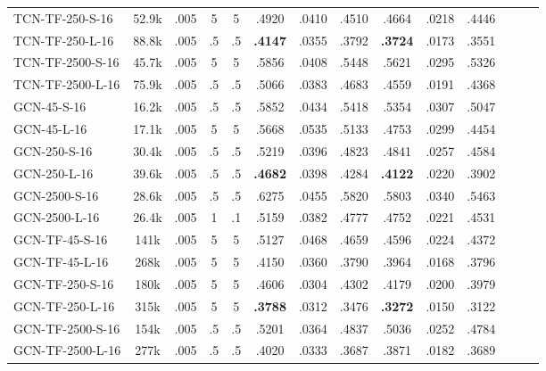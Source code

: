 \begin{table*}[h]
\begin{tabular}{lccccccccccccc}
        TCN-TF-250-S-16               
            & 52.9k & .005 & 5 & 5 & .4920 & .0410 & .4510 & .4664 & .0218 & .4446 \\
        TCN-TF-250-L-16               
            & 88.8k & .005 & .5 & .5 & \textbf{.4147} & .0355 & .3792 & \textbf{.3724} & .0173 & .3551 \\
        TCN-TF-2500-S-16               
            & 45.7k & .005 & 5 & 5 & .5856 & .0408 & .5448 & .5621 & .0295 & .5326 \\
        TCN-TF-2500-L-16               
            & 75.9k & .005 & .5 & .5 & .5066 & .0383 & .4683 & .4559 & .0191 & .4368 \\
        \midrule
        GCN-45-S-16               
            & 16.2k & .005 & .5 & .5 & .5852 & .0434 & .5418 & .5354 & .0307 & .5047 \\ 
        GCN-45-L-16               
            & 17.1k & .005 & 5 & 5 & .5668 & .0535 & .5133 & .4753 & .0299 & .4454 \\
        GCN-250-S-16               
            & 30.4k & .005 & .5 & .5 & .5219 & .0396 & .4823 & .4841 & .0257 & .4584 \\ 
        GCN-250-L-16               
            & 39.6k & .005 & .5 & .5 & \textbf{.4682} & .0398 & .4284 & \textbf{.4122} & .0220 & .3902 \\
        GCN-2500-S-16               
            & 28.6k & .005 & .5 & .5 & .6275 & .0455 & .5820 & .5803 & .0340 & .5463 \\ 
        GCN-2500-L-16               
            & 26.4k & .005 & 1 & .1 & .5159 & .0382 & .4777 & .4752 & .0221 & .4531 \\
        \midrule
        GCN-TF-45-S-16               
            & 141k & .005 & 5 & 5 & .5127 & .0468 & .4659 & .4596 & .0224 & .4372 \\
        GCN-TF-45-L-16               
            & 268k & .005 & 5 & 5 & .4150 & .0360 & .3790 & .3964 & .0168 & .3796 \\
        GCN-TF-250-S-16               
            & 180k & .005 & 5 & 5 & .4606 & .0304 & .4302 & .4179 & .0200 & .3979 \\
        GCN-TF-250-L-16               
            & 315k & .005 & 5 & 5 & \textbf{.3788} & .0312 & .3476 & \textbf{.3272} & .0150 & .3122 \\
        GCN-TF-2500-S-16               
            & 154k & .005 & .5 & .5 & .5201 & .0364 & .4837 & .5036 & .0252 & .4784 \\
        GCN-TF-2500-L-16               
            & 277k & .005 & .5 & .5 & .4020 & .0333 & .3687 & .3871 & .0182 & .3689 \\

\end{tabular}
\end{table*}
